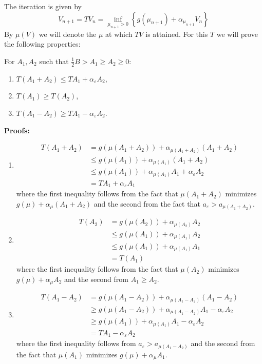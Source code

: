 The iteration is given by
\begin{equation}\label{eq:Miteration}
V_{n+1}=TV_n=\inf\limits_{\mu_{n+1}>0}\left\{g(\mu_{n+1})+\alpha_{\mu_{n+1}}V_n\right\}
\end{equation}
By $\mu(V)$ we will denote the $\mu$ at which $TV$ is attained.
For this $T$ we will prove the following properties:
\begin{lemma}\label{lemma:Tproperties}
For $A_1,A_2$ such that $\frac{1}{2}B>A_1\geq A_2\geq 0$: 
\begin{enumerate}
\item $T(A_1+A_2)\leq TA_1+\alpha_\varepsilon A_2$,
\item $T(A_1)\geq T(A_2)$,
\item $T(A_1-A_2)\geq TA_1-\alpha_\varepsilon A_2$.
\end{enumerate}
\textbf{Proofs:}
\begin{enumerate}
\item 
\begin{equation}
\begin{split}
T(A_1+A_2)&=g(\mu(A_1+A_2))+\alpha_{\mu(A_1+A_2)}(A_1+A_2)\\
&\leq g(\mu(A_1))+\alpha_{\mu(A_1)}(A_1+A_2)\\
&\leq g(\mu(A_1))+\alpha_{\mu(A_1)}A_1+\alpha_\varepsilon A_2\\
&=TA_1+\alpha_\varepsilon A_1 
\end{split}
\end{equation} 
where the first inequality follows from the fact that $\mu(A_1+A_2)$ minimizes $g(\mu)+\alpha_\mu (A_1+A_2)$ and the second from the fact that $a_\varepsilon>a_{\mu(A_1+A_2)}$.
\item 
\begin{equation}
\begin{split}
T(A_2)&=g(\mu(A_2))+\alpha_{\mu(A_2)}A_2\\
&\leq g(\mu(A_1))+\alpha_{\mu(A_1)}A_2\\
&\leq g(\mu(A_1))+\alpha_{\mu(A_1)}A_1\\
&=T(A_1)
\end{split}
\end{equation}
where the first inequality follows from the fact that $\mu(A_2)$ minimizes $g(\mu)+\alpha_\mu A_2$ and the second from $A_1\geq A_2$.
\item 
\begin{equation}
\begin{split}
T(A_1-A_2)&=g(\mu(A_1-A_2))+\alpha_{\mu(A_1-A_2)}(A_1-A_2)\\
&\geq g(\mu(A_1-A_2))+\alpha_{\mu(A_1-A_2)}A_1 - \alpha_\varepsilon A_2\\
&\geq g(\mu(A_1))+\alpha_{\mu(A_1)}A_1-\alpha_\varepsilon A_2\\
&=TA_1-\alpha_\varepsilon A_2
\end{split}
\end{equation}
where the first inequality follows from $a_\varepsilon>a_{\mu(A_1-A_2)}$ and the second from the fact that $\mu(A_1)$ minimizes $g(\mu)+\alpha_\mu A_1$.
\end{enumerate}
\end{lemma}

